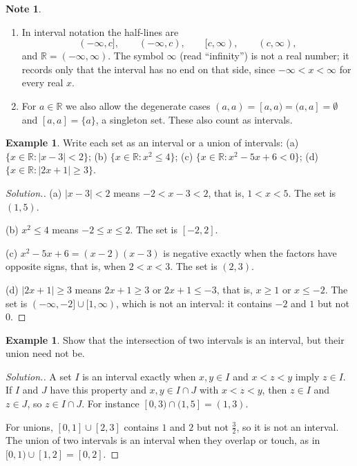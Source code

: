 \documentclass[11pt,a4paper]{article}
\numberwithin{equation}{section}
\theoremstyle{definition}
\newtheorem{exa}[thm]{Example}
\newtheorem*{note}{Note}
\newenvironment{solution}
  {\renewcommand{\qedsymbol}{}\begin{proof}[\textit{Solution}.]}
  {\end{proof}}
\begin{document}
\begin{note}
\begin{enumerate}
\item In interval notation the half-lines are
$$(-\infty , c],\qquad (-\infty , c),\qquad [c,\infty),\qquad (c,\infty),$$
and $\mathbb{R} = (-\infty , \infty)$. The symbol $\infty$ (read ``infinity'') is not a real number; it records only that the interval has no end on that side, since $-\infty < x < \infty$ for every real $x$.

\item For $a \in \mathbb{R}$ we also allow the degenerate cases $(a,a) = [a,a) = (a,a] = \emptyset$ and $[a,a] = \{a\}$, a singleton set. These also count as intervals.
\end{enumerate}
\end{note}

\begin{exa}
Write each set as an interval or a union of intervals:
(a) $\{x\in\mathbb{R}: |x-3|<2\}$; (b) $\{x\in\mathbb{R}: x^2\leq 4\}$; (c) $\{x\in\mathbb{R}: x^2-5x+6<0\}$; (d) $\{x\in\mathbb{R}: |2x+1|\geq 3\}$.
\end{exa}

\begin{solution}
(a) $|x-3|<2$ means $-2<x-3<2$, that is, $1<x<5$. The set is $(1,5)$.

(b) $x^2\leq 4$ means $-2\leq x\leq 2$. The set is $[-2,2]$.

(c) $x^2-5x+6 = (x-2)(x-3)$ is negative exactly when the factors have opposite signs, that is, when $2<x<3$. The set is $(2,3)$.

(d) $|2x+1|\geq 3$ means $2x+1\geq 3$ or $2x+1\leq -3$, that is, $x\geq 1$ or $x\leq -2$. The set is $(-\infty,-2]\cup[1,\infty)$, which is not an interval: it contains $-2$ and $1$ but not $0$.
\end{solution}

\begin{exa}
Show that the intersection of two intervals is an interval, but their union need not be.
\end{exa}

\begin{solution}
A set $I$ is an interval exactly when $x,y\in I$ and $x<z<y$ imply $z\in I$. If $I$ and $J$ have this property and $x,y\in I\cap J$ with $x<z<y$, then $z\in I$ and $z\in J$, so $z\in I\cap J$. For instance $[0,3)\cap(1,5] = (1,3)$.

For unions, $[0,1]\cup[2,3]$ contains $1$ and $2$ but not $\frac{3}{2}$, so it is not an interval. The union of two intervals is an interval when they overlap or touch, as in $[0,1)\cup[1,2] = [0,2]$.
\end{solution}
\end{document}
